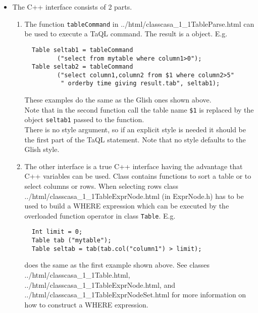 \begin{itemize}
\item
  The C++ interface consists of 2 parts.
  \begin{enumerate}
  \item
    The function \texttt{tableCommand} in
    {../html/classcasa_1_1TableParse.html}
    can be used to execute a TaQL command. The result is a
    object. E.g.
\begin{verbatim}
  Table seltab1 = tableCommand
         ("select from mytable where column1>0");
  Table seltab2 = tableCommand
         ("select column1,column2 from $1 where column2>5"
          " orderby time giving result.tab", seltab1);
\end{verbatim}
    These examples do the same as the Glish ones shown above.
    \\Note that in the second function call the table name
    \texttt{\$1} is replaced by the object \texttt{seltab1}
    passed to the function.
    \\There is no style argument, so if an explicit style is needed it
    should be the first part of the TaQL statement. Note that no style
    defaults to the Glish style.

  \item
    The other interface is a true C++ interface having the
    advantage that C++ variables can be used. Class
    contains functions to sort a table or to select columns or rows.
    When selecting rows class 
    {../html/classcasa_1_1TableExprNode.html} (in ExprNode.h)
    has to be used to
    build a WHERE expression which can be executed by the overloaded
    function operator in class \texttt{Table}. E.g.
\begin{verbatim}
  Int limit = 0;
  Table tab ("mytable");
  Table seltab = tab(tab.col("column1") > limit);
\end{verbatim}
    does the same as the first example shown above.
    See classes 
    {../html/classcasa_1_1Table.html},
    {../html/classcasa_1_1TableExprNode.html}, and
    {../html/classcasa_1_1TableExprNodeSet.html} for more
    information on how to construct a WHERE expression.
  \end{enumerate}
  
\end{itemize}

